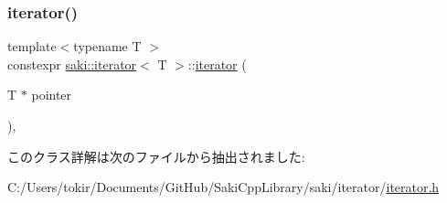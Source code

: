 \subsubsection{\texorpdfstring{iterator()}{iterator()}}
{\footnotesize\ttfamily template$<$typename T $>$ \\
constexpr \mbox{\hyperlink{classsaki_1_1iterator}{saki\+::iterator}}$<$ T $>$\+::\mbox{\hyperlink{classsaki_1_1iterator}{iterator}} (\begin{DoxyParamCaption}\item[{T $\ast$}]{pointer }\end{DoxyParamCaption})\hspace{0.3cm}{\ttfamily [inline]}, {\ttfamily [explicit]}}



このクラス詳解は次のファイルから抽出されました\+:\begin{DoxyCompactItemize}
\item 
C\+:/\+Users/tokir/\+Documents/\+Git\+Hub/\+Saki\+Cpp\+Library/saki/iterator/\mbox{\hyperlink{iterator_2iterator_8h}{iterator.\+h}}\end{DoxyCompactItemize}
